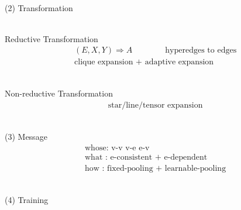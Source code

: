 \documentclass{article}
\begin{document}
~ \\[3pt]
(2) Transformation

~ \\[3pt]
Reductive Transformation
\begin{align*}
    & ( E, X, Y ) \Rightarrow A 
    \qquad \qquad 
    \text{hyperedges to edges} \\[3pt]
    & \text{clique expansion + adaptive expansion}
\end{align*}

~ \\[3pt]
Non-reductive Transformation
\begin{align*}
    & \text{star/line/tensor expansion}
\end{align*}


~ \\[3pt]
(3) Message
\begin{align*}
    & \text{whose: v-v \ v-e \ e-v} \\[3pt]
    & \text{what : e-consistent + e-dependent} \\[3pt]
    & \text{how  : fixed-pooling + learnable-pooling} 
\end{align*}


~ \\[3pt]
(4) Training
\end{document}
